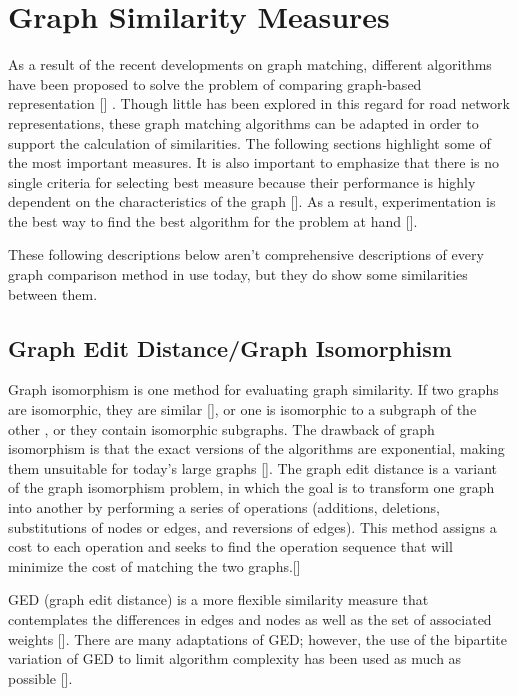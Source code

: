 \section{Graph Similarity Measures}
As a result of the recent developments on graph matching, different algorithms have been proposed to solve the problem of comparing graph-based representation [\cite{Bunke:2000}] . Though little has been explored in this regard for road network representations, these graph matching algorithms can be adapted in order to support the calculation of similarities. The following sections highlight some of the most important measures. It is also important to emphasize that there is no single criteria for selecting best measure because their performance is highly dependent on the characteristics of the graph [\cite{Papadimitriou:2010}]. As a result, experimentation is the best way to find the best algorithm for the problem at hand [\cite{Jouili:2010}]. 

These following descriptions below aren't comprehensive descriptions of every graph comparison method in use today, but they do show some similarities between them.

\subsection{Graph Edit Distance/Graph Isomorphism}
Graph isomorphism is one method for evaluating graph similarity. If two graphs are isomorphic, they are similar [\cite{Pelillo:1999}], or one is isomorphic to a subgraph of the other , or they contain isomorphic subgraphs. The drawback of graph isomorphism is that the exact versions of the algorithms are exponential, making them unsuitable for today's large graphs [\cite{Koutra:2011}]. The graph edit distance is a variant of the graph isomorphism problem, in which the goal is to transform one graph into another by performing a series of operations (additions, deletions, substitutions of nodes or edges, and reversions of edges). This method assigns a cost to each operation and seeks to find the operation sequence that will minimize the cost of matching the two graphs.[\cite{Koutra:2011}]

GED (graph edit distance) is a more flexible similarity measure that contemplates the differences in edges and nodes as well as the set of associated weights [\cite{Gao:2010}]. There are many adaptations of GED; however, the use of the bipartite variation of GED to limit algorithm complexity has been used as much as possible [\cite{Manrique:2018}]. 

